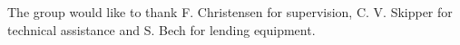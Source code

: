The group would like to thank F. Christensen for supervision, C. V. Skipper for technical assistance and S. Bech for lending equipment.
